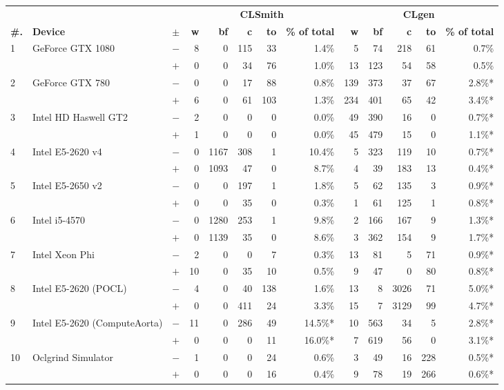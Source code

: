   \begin{tabular}{lll | rrrrr | rrrrr }
  \toprule
  & & & \multicolumn{5}{c|}{\textbf{CLSmith}} & \multicolumn{5}{c}{\textbf{CLgen}} \\
  \textbf{\#.} & \textbf{Device} & $\pm$ &
  \textbf{w} & \textbf{bf} & \textbf{c} & \textbf{to} & \textbf{\% of total} &
  \textbf{w} & \textbf{bf} & \textbf{c} & \textbf{to} & \textbf{\% of total} \\
  \midrule
  \multirow{ 2}{*}{1} & \multirow{ 2}{*}{GeForce GTX 1080} & $-$ & 8 & 0 & 115 & 33 & 1.4\%       & 5 & 74 & 218 & 61 & 0.7\% \\& & $+$ & 0 & 0 & 34 & 76 & 1.0\% & 13 & 123 & 54 & 58 & 0.5\% \\
\hline
\multirow{ 2}{*}{2} & \multirow{ 2}{*}{GeForce GTX 780} & $-$ & 0 & 0 & 17 & 88 & 0.8\%       & 139 & 373 & 37 & 67 & 2.8\%* \\& & $+$ & 6 & 0 & 61 & 103 & 1.3\% & 234 & 401 & 65 & 42 & 3.4\%* \\
\hline
\multirow{ 2}{*}{3} & \multirow{ 2}{*}{Intel HD Haswell GT2} & $-$ & 2 & 0 & 0 & 0 & 0.0\%       & 49 & 390 & 16 & 0 & 0.7\%* \\& & $+$ & 1 & 0 & 0 & 0 & 0.0\% & 45 & 479 & 15 & 0 & 1.1\%* \\
\hline
\multirow{ 2}{*}{4} & \multirow{ 2}{*}{Intel E5-2620 v4} & $-$ & 0 & 1167 & 308 & 1 & 10.4\%       & 5 & 323 & 119 & 10 & 0.7\%* \\& & $+$ & 0 & 1093 & 47 & 0 & 8.7\% & 4 & 39 & 183 & 13 & 0.4\%* \\
\hline
\multirow{ 2}{*}{5} & \multirow{ 2}{*}{Intel E5-2650 v2} & $-$ & 0 & 0 & 197 & 1 & 1.8\%       & 5 & 62 & 135 & 3 & 0.9\%* \\& & $+$ & 0 & 0 & 35 & 0 & 0.3\% & 1 & 61 & 125 & 1 & 0.8\%* \\
\hline
\multirow{ 2}{*}{6} & \multirow{ 2}{*}{Intel i5-4570} & $-$ & 0 & 1280 & 253 & 1 & 9.8\%       & 2 & 166 & 167 & 9 & 1.3\%* \\& & $+$ & 0 & 1139 & 35 & 0 & 8.6\% & 3 & 362 & 154 & 9 & 1.7\%* \\
\hline
\multirow{ 2}{*}{7} & \multirow{ 2}{*}{Intel Xeon Phi} & $-$ & 2 & 0 & 0 & 7 & 0.3\%       & 13 & 81 & 5 & 71 & 0.9\%* \\& & $+$ & 10 & 0 & 35 & 10 & 0.5\% & 9 & 47 & 0 & 80 & 0.8\%* \\
\hline
\multirow{ 2}{*}{8} & \multirow{ 2}{*}{Intel E5-2620 (POCL)} & $-$ & 4 & 0 & 40 & 138 & 1.6\%       & 13 & 8 & 3026 & 71 & 5.0\%* \\& & $+$ & 0 & 0 & 411 & 24 & 3.3\% & 15 & 7 & 3129 & 99 & 4.7\%* \\
\hline
\multirow{ 2}{*}{9} & \multirow{ 2}{*}{Intel E5-2620 (ComputeAorta)} & $-$ & 11 & 0 & 286 & 49 & 14.5\%*       & 10 & 563 & 34 & 5 & 2.8\%* \\& & $+$ & 0 & 0 & 0 & 11 & 16.0\%* & 7 & 619 & 56 & 0 & 3.1\%* \\
\hline
\multirow{ 2}{*}{10} & \multirow{ 2}{*}{Oclgrind Simulator} & $-$ & 1 & 0 & 0 & 24 & 0.6\%       & 3 & 49 & 16 & 228 & 0.5\%* \\& & $+$ & 0 & 0 & 0 & 16 & 0.4\% & 9 & 78 & 19 & 266 & 0.6\%* \\
  \bottomrule
\end{tabular}


